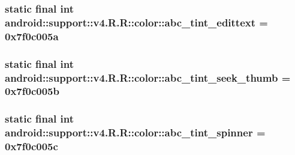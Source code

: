 \hypertarget{classandroid_1_1support_1_1v4_1_1_r_1_1color_0bd431d0cb7b7979d28774d9591cc17a}{
\subsubsection[{abc\_\-tint\_\-edittext}]{\setlength{\rightskip}{0pt plus 5cm}static final int android::support::v4.R.R::color::abc\_\-tint\_\-edittext = 0x7f0c005a}}
\label{classandroid_1_1support_1_1v4_1_1_r_1_1color_0bd431d0cb7b7979d28774d9591cc17a}


\hypertarget{classandroid_1_1support_1_1v4_1_1_r_1_1color_05532c3088d0519091986e5b7389bf63}{
\subsubsection[{abc\_\-tint\_\-seek\_\-thumb}]{\setlength{\rightskip}{0pt plus 5cm}static final int android::support::v4.R.R::color::abc\_\-tint\_\-seek\_\-thumb = 0x7f0c005b}}
\label{classandroid_1_1support_1_1v4_1_1_r_1_1color_05532c3088d0519091986e5b7389bf63}


\hypertarget{classandroid_1_1support_1_1v4_1_1_r_1_1color_779003277f081310d35f683f92083eef}{
\subsubsection[{abc\_\-tint\_\-spinner}]{\setlength{\rightskip}{0pt plus 5cm}static final int android::support::v4.R.R::color::abc\_\-tint\_\-spinner = 0x7f0c005c}}
\label{classandroid_1_1support_1_1v4_1_1_r_1_1color_779003277f081310d35f683f92083eef}


